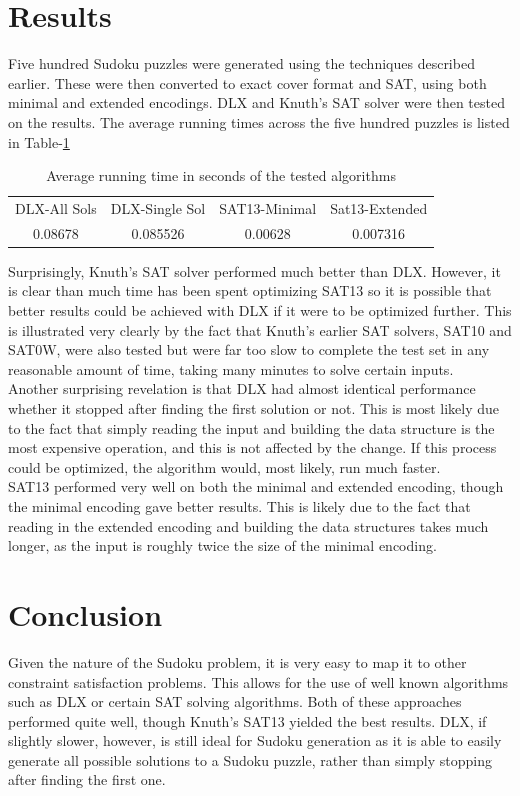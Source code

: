 \documentclass[12pt]{article}
\begin{document}
\section{Results}
Five hundred Sudoku puzzles were generated using the techniques described earlier. These were then converted to exact cover format and SAT, using both minimal and extended encodings. DLX and Knuth's SAT solver were then tested on the results. The average running times across the five hundred puzzles is listed in Table-\ref{table:runningtime}

\begin{table}[H]
\begin{center}
\begin{tabular}{cccc}
DLX-All Sols & DLX-Single Sol & SAT13-Minimal & Sat13-Extended\\
0.08678 & 0.085526 & 0.00628 & 0.007316
\end{tabular}
\caption{Average running time in seconds of the tested algorithms}
\label{table:runningtime}
\end{center}
\end{table}

Surprisingly, Knuth's SAT solver performed much better than DLX. However, it is clear than much time has been spent optimizing SAT13 so it is possible that better results could be achieved with DLX if it were to be optimized further. This is illustrated very clearly by the fact that Knuth's earlier SAT solvers, SAT10 and SAT0W, were also tested but were far too slow to complete the test set in any reasonable amount of time, taking many minutes to solve certain inputs. \\

Another surprising revelation is that DLX had almost identical performance whether it stopped after finding the first solution or not. This is most likely due to the fact that simply reading the input and building the data structure is the most expensive operation, and this is not affected by the change. If this process could be optimized, the algorithm would, most likely, run much faster. \\

SAT13 performed very well on both the minimal and extended encoding, though the minimal encoding gave better results. This is likely due to the fact that reading in the extended encoding and building the data structures takes much longer, as the input is roughly twice the size of the minimal encoding. 
\section{Conclusion}
Given the nature of the Sudoku problem, it is very easy to map it to other constraint satisfaction problems. This allows for the use of well known algorithms such as DLX or certain SAT solving algorithms. Both of these approaches performed quite well, though Knuth's SAT13 yielded the best results. DLX, if slightly slower, however, is still ideal for Sudoku generation as it is able to easily generate all possible solutions to a Sudoku puzzle, rather than simply stopping after finding the first one.
\pagebreak
\end{document}
